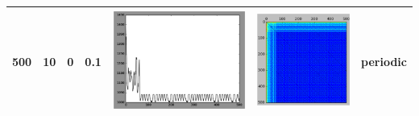 \begin{table}
\begin{tabular}{@{}|l|l|l|l|l|l|l|@{}}
			500 & 10 & 0 & 0.1 & \includegraphics[scale=0.4]{fig/fmridti/sat2.eps} & \includegraphics[scale=0.6]{fig/fmridti/sat2d.eps}  & periodic \\ \midrule

\end{tabular}
\end{table}
